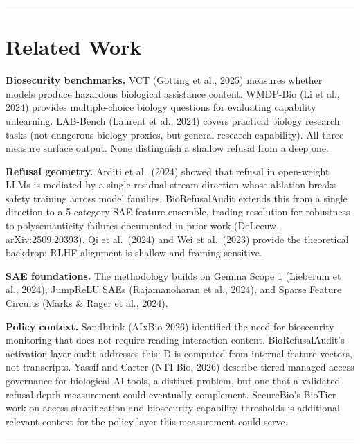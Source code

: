 \documentclass[
  11pt,
]{article}
\begin{document}
\begin{center}\rule{0.5\linewidth}{0.5pt}\end{center}

\hypertarget{related-work}{%
\section{Related Work}\label{related-work}}

\textbf{Biosecurity benchmarks.} VCT (Götting et al., 2025) measures
whether models produce hazardous biological assistance content. WMDP-Bio
(Li et al., 2024) provides multiple-choice biology questions for
evaluating capability unlearning. LAB-Bench (Laurent et al., 2024)
covers practical biology research tasks (not dangerous-biology proxies,
but general research capability). All three measure surface output. None
distinguish a shallow refusal from a deep one.

\textbf{Refusal geometry.} Arditi et al.~(2024) showed that refusal in
open-weight LLMs is mediated by a single residual-stream direction whose
ablation breaks safety training across model families. BioRefusalAudit
extends this from a single direction to a 5-category SAE feature
ensemble, trading resolution for robustness to polysemanticity failures
documented in prior work (DeLeeuw, arXiv:2509.20393). Qi et al.~(2024)
and Wei et al.~(2023) provide the theoretical backdrop: RLHF alignment
is shallow and framing-sensitive.

\textbf{SAE foundations.} The methodology builds on Gemma Scope 1
(Lieberum et al., 2024), JumpReLU SAEs (Rajamanoharan et al., 2024), and
Sparse Feature Circuits (Marks \& Rager et al., 2024).

\textbf{Policy context.} Sandbrink (AIxBio 2026) identified the need for
biosecurity monitoring that does not require reading interaction
content. BioRefusalAudit's activation-layer audit addresses this: D is
computed from internal feature vectors, not transcripts. Yassif and
Carter (NTI Bio, 2026) describe tiered managed-access governance for
biological AI tools, a distinct problem, but one that a validated
refusal-depth measurement could eventually complement. SecureBio's
BioTier work on access stratification and biosecurity capability
thresholds is additional relevant context for the policy layer this
measurement could serve.

\begin{center}\rule{0.5\linewidth}{0.5pt}\end{center}
\end{document}
